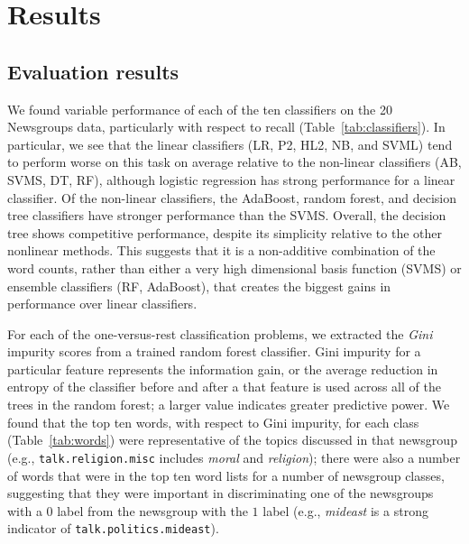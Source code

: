 \documentclass{article} %
\begin{document}
\section{Results}

\subsection{Evaluation results}

We found variable performance of each of the ten classifiers on the 20 Newsgroups data, particularly with respect to recall (Table~\ref{tab:classifiers}). In particular, we see that the linear classifiers (LR, P2, HL2, NB, and SVML) tend to perform worse on this task on average relative to the non-linear classifiers (AB, SVMS, DT, RF), although logistic regression has strong performance for a linear classifier. Of the non-linear classifiers, the AdaBoost, random forest, and decision tree classifiers have stronger performance than the SVMS. Overall, the decision tree shows competitive performance, despite its simplicity relative to the other nonlinear methods. This suggests that it is a non-additive combination of the word counts, rather than either a very high dimensional basis function (SVMS) or ensemble classifiers (RF, AdaBoost), that creates the biggest gains in performance over linear classifiers.

For each of the one-versus-rest classification problems, we extracted the \emph{Gini} impurity scores from a trained random forest classifier. Gini impurity for a particular feature represents the information gain, or the average reduction in entropy of the classifier before and after a that feature is used across all of the trees in the random forest; a larger value indicates greater predictive power. We found that the top ten words, with respect to Gini impurity, for each class (Table~\ref{tab:words}) were representative of the topics discussed in that newsgroup (e.g., {\tt talk.religion.misc} includes \emph{moral} and \emph{religion}); there were also a number of words that were in the top ten word lists for a number of newsgroup classes, suggesting that they were important in discriminating one of the newsgroups with a $0$ label from the newsgroup with the $1$ label (e.g., \emph{mideast} is a strong indicator of {\tt talk.politics.mideast}).
\end{document}
